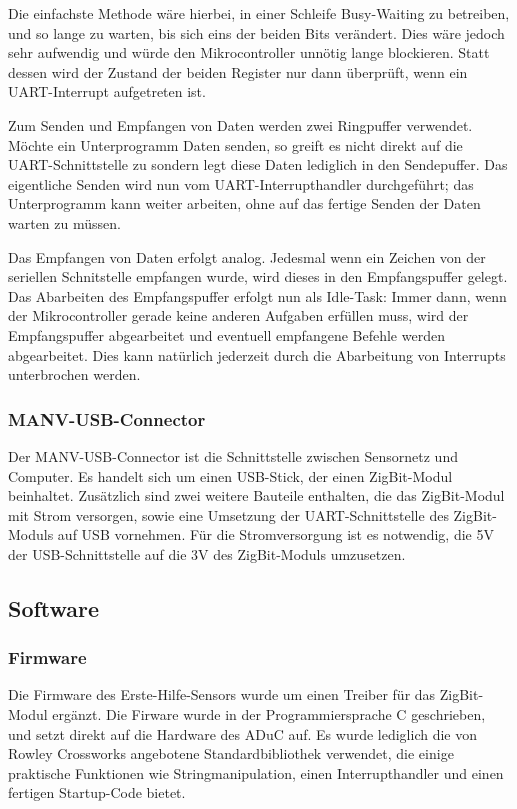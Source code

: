 Die einfachste Methode wäre hierbei, in einer Schleife Busy-Waiting zu betreiben, und so lange zu warten,
bis sich eins der beiden Bits verändert. Dies wäre jedoch sehr aufwendig und würde den Mikrocontroller 
unnötig lange blockieren. Statt dessen wird der Zustand der beiden Register nur dann überprüft, wenn ein 
UART-Interrupt aufgetreten ist.

Zum Senden und Empfangen von Daten werden zwei Ringpuffer verwendet. Möchte ein Unterprogramm Daten senden,
so greift es nicht direkt auf die UART-Schnittstelle zu sondern legt diese Daten lediglich in den Sendepuffer.
Das eigentliche Senden wird nun vom UART-Interrupthandler durchgeführt; das Unterprogramm kann weiter arbeiten,
ohne auf das fertige Senden der Daten warten zu müssen.

Das Empfangen von Daten erfolgt analog. Jedesmal wenn ein Zeichen von der seriellen Schnitstelle empfangen
wurde, wird dieses in den Empfangspuffer gelegt. Das Abarbeiten des Empfangspuffer erfolgt nun als Idle-Task:
Immer dann, wenn der Mikrocontroller gerade keine anderen Aufgaben erfüllen muss, wird der Empfangspuffer
abgearbeitet und eventuell empfangene Befehle werden abgearbeitet. Dies kann natürlich jederzeit durch 
die Abarbeitung von Interrupts unterbrochen werden.

\subsubsection{MANV-USB-Connector}
Der MANV-USB-Connector ist die Schnittstelle zwischen Sensornetz und Computer. Es handelt sich um einen USB-Stick, der einen
ZigBit-Modul beinhaltet. Zusätzlich sind zwei weitere Bauteile enthalten, die das ZigBit-Modul mit Strom versorgen, sowie eine
Umsetzung der UART-Schnittstelle des ZigBit-Moduls auf USB vornehmen. Für die Stromversorgung ist es notwendig, die 5V der
USB-Schnittstelle auf die 3V des ZigBit-Moduls umzusetzen.

\subsection{Software}

\subsubsection{Firmware}
Die Firmware des Erste-Hilfe-Sensors wurde um einen Treiber für das ZigBit-Modul ergänzt. Die Firware wurde in der
Programmiersprache C geschrieben, und setzt direkt auf die Hardware des ADuC auf. Es wurde lediglich die von 
Rowley Crossworks angebotene Standardbibliothek verwendet, die einige praktische Funktionen wie Stringmanipulation,
einen Interrupthandler und einen fertigen Startup-Code bietet.

